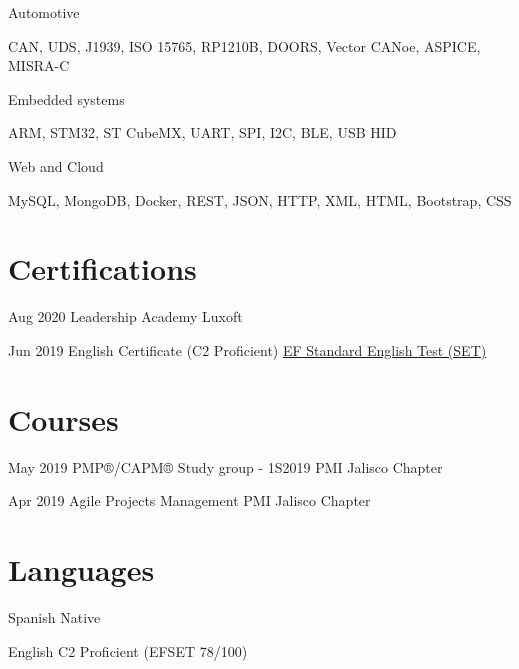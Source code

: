 \documentclass[10pt, letterpaper]{article} %
\begin{document}
\skillgroup
{Automotive}
{
\begin{itemize-bullets}
\item{CAN, UDS, J1939, ISO 15765, RP1210B, DOORS, Vector CANoe, ASPICE, MISRA-C}
\end{itemize-bullets}
}


\skillgroup
{Embedded systems}
{
\begin{itemize-bullets}
\item{ARM, STM32, ST CubeMX, UART, SPI, I2C, BLE, USB HID}
\end{itemize-bullets}
}

\skillgroup
{Web and Cloud}
{
\begin{itemize-bullets}
\item{MySQL, MongoDB, Docker, REST, JSON, HTTP, XML, HTML, Bootstrap, CSS}
\end{itemize-bullets}
}





\section{Certifications}

\dateitem
{Aug 2020}
{Leadership Academy}
{Luxoft}

\dateitem
{Jun 2019}
{English Certificate (C2 Proficient)}
{\href{https://www.efset.org/cert/BAUjza}{EF Standard English Test (SET)}}


\section{Courses}

\dateitem
{May 2019}
{PMP®/CAPM® Study group - 1S2019}
{PMI Jalisco Chapter}

\dateitem
{Apr 2019}
{Agile Projects Management}
{PMI Jalisco Chapter}


\section{Languages}

\langitem
{Spanish}
{Native}

\langitem
{English}
{C2 Proficient (EFSET 78/100)}

\end{document}
